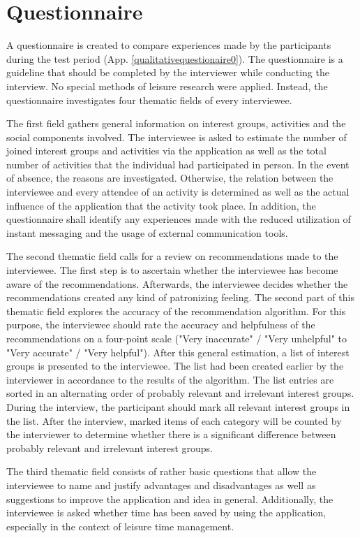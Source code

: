 \documentclass[12pt,numbers=noenddot,parskip,bibliography=totocnumbered,listof=totocnumbered,draft]{scrreprt}
\begin{document}
\section{Questionnaire}
A questionnaire is created to compare experiences made by the participants during the test period (App. \ref{qualitativequestionaire0}). The questionnaire is a guideline that should be completed by the interviewer while conducting the interview. No special methods of leisure research were applied. Instead, the questionnaire investigates four thematic fields of every interviewee.

The first field gathers general information on interest groups, activities and the social components involved. The interviewee is asked to estimate the number of joined interest groups and activities via the application as well as the total number of activities that the individual had participated in person. In the event of absence, the reasons are investigated. Otherwise, the relation between the interviewee and every attendee of an activity is determined as well as the actual influence of the application that the activity took place. In addition, the questionnaire shall identify any experiences made with the reduced utilization of instant messaging and the usage of external communication tools.

The second thematic field calls for a review on recommendations made to the interviewee. The first step is to ascertain whether the interviewee has become aware of the recommendations. Afterwards, the interviewee decides whether the recommendations created any kind of patronizing feeling. The second part of this thematic field explores the accuracy of the recommendation algorithm. For this purpose, the interviewee should rate the accuracy and helpfulness of the recommendations on a four-point scale ("Very inaccurate" / "Very unhelpful" to "Very accurate" / "Very helpful"). After this general estimation, a list of interest groups is presented to the interviewee. The list had been created earlier by the interviewer in accordance to the results of the algorithm. The list entries are sorted in an alternating order of probably relevant and irrelevant interest groups. During the interview, the participant should mark all relevant interest groups in the list. After the interview, marked items of each category will be counted by the interviewer to determine whether there is a significant difference between probably relevant and irrelevant interest groups.

The third thematic field consists of rather basic questions that allow the interviewee to name and justify advantages and disadvantages as well as suggestions to improve the application and idea in general. Additionally, the interviewee is asked whether time has been saved by using the application, especially in the context of leisure time management.
\end{document}
